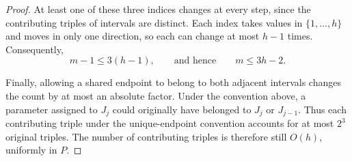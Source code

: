 \documentclass[10pt,a4paper]{amsart}
\begin{document}
\begin{proof}
At least one of these three indices changes at every step, since the
contributing triples of intervals are distinct. Each index takes
values in $\{1,\ldots,h\}$ and moves in only one direction, so each can
change at most $h-1$ times. Consequently,
\[
    m-1\le 3(h-1),
    \qquad\text{and hence}\qquad
    m\le 3h-2.
\]

Finally, allowing a shared endpoint to belong to both adjacent
intervals changes the count by at most an absolute factor. Under the
convention above, a parameter assigned to $J_j$ could originally have
belonged to $J_j$ or $J_{j-1}$. Thus each contributing triple under the
unique-endpoint convention accounts for at most $2^3$ original triples.
The number of contributing triples is therefore still $O(h)$, uniformly
in $P$.









\end{proof}
\end{document}
